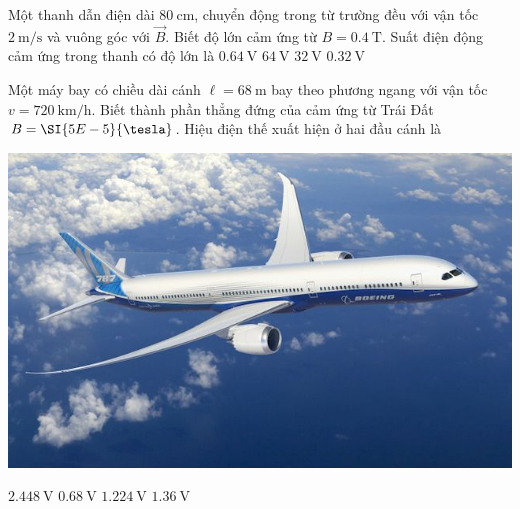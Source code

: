 \begin{ex}
	Một thanh dẫn điện dài $\SI{80}{\centi\meter}$, chuyển động trong từ trường đều với vận tốc $\SI{2}{\meter/\second}$ và vuông góc với $\vec{B}$. Biết độ lớn cảm ứng từ $B=\SI{0.4}{\tesla}$. Suất điện động cảm ứng trong thanh có độ lớn là	
	\choice
	{\True $\SI{0.64}{\volt}$}
	{$\SI{64}{\volt}$}
	{$\SI{32}{\volt}$}
	{$\SI{0.32}{\volt}$}
\end{ex}

\begin{ex}
	Một máy bay có chiều dài cánh $\ell=\SI{68}{\meter}$ bay theo phương ngang với vận tốc $v=\SI{720}{\kilo\meter/\hour}$. Biết thành phần thẳng đứng của cảm ứng từ Trái Đất $B=\SI{5E-5}{\tesla}$. Hiệu điện thế xuất hiện ở hai đầu cánh là
	\begin{center}
		\includegraphics[width=0.3\linewidth]{figs/VN12-Y24-PH-SYL-022P-2}
	\end{center}
	\choice
	{$\SI{2.448}{\volt}$}
	{\True $\SI{0.68}{\volt}$}
	{$\SI{1.224}{\volt}$}
	{$\SI{1.36}{\volt}$}
\end{ex}


